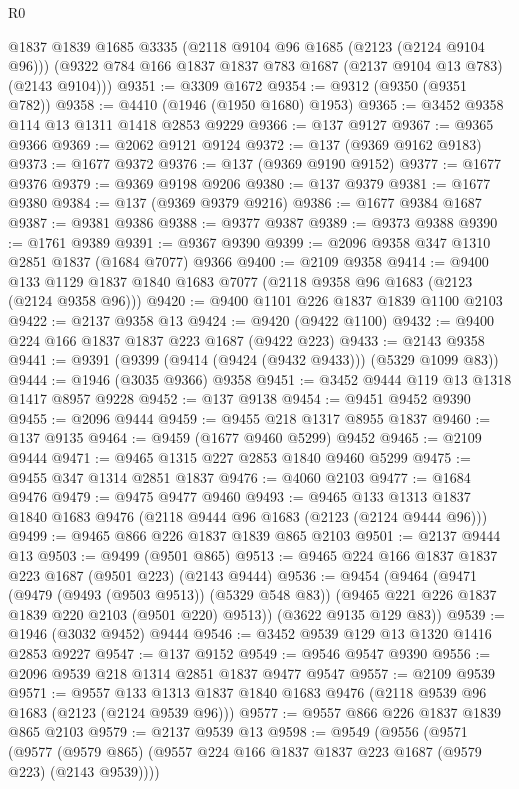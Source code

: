 \begin{lexlean}{R0}
\begin{coremodule}
      @1837
      @1839
      @1685
      @3335
      (@2118 @9104 @96 @1685 (@2123 (@2124 @9104 @96)))
      (@9322 @784 @166 @1837 @1837 @783 @1687 (@2137 @9104 @13 @783) (@2143 @9104)))
@9351 := @3309 @1672
@9354 := @9312 (@9350 (@9351 @782))
@9358 := @4410 (@1946 (@1950 @1680) @1953)
@9365 := @3452 @9358 @114 @13 @1311 @1418 @2853 @9229
@9366 := @137 @9127
@9367 := @9365 @9366
@9369 := @2062 @9121 @9124
@9372 := @137 (@9369 @9162 @9183)
@9373 := @1677 @9372
@9376 := @137 (@9369 @9190 @9152)
@9377 := @1677 @9376
@9379 := @9369 @9198 @9206
@9380 := @137 @9379
@9381 := @1677 @9380
@9384 := @137 (@9369 @9379 @9216)
@9386 := @1677 @9384 @1687
@9387 := @9381 @9386
@9388 := @9377 @9387
@9389 := @9373 @9388
@9390 := @1761 @9389
@9391 := @9367 @9390
@9399 := @2096 @9358 @347 @1310 @2851 @1837 (@1684 @7077) @9366
@9400 := @2109 @9358
@9414 := @9400 @133 @1129 @1837 @1840 @1683 @7077 (@2118 @9358 @96 @1683 (@2123 (@2124 @9358 @96)))
@9420 := @9400 @1101 @226 @1837 @1839 @1100 @2103
@9422 := @2137 @9358 @13
@9424 := @9420 (@9422 @1100)
@9432 := @9400 @224 @166 @1837 @1837 @223 @1687 (@9422 @223)
@9433 := @2143 @9358
@9441 := @9391 (@9399 (@9414 (@9424 (@9432 @9433))) (@5329 @1099 @83))
@9444 := @1946 (@3035 @9366) @9358
@9451 := @3452 @9444 @119 @13 @1318 @1417 @8957 @9228
@9452 := @137 @9138
@9454 := @9451 @9452 @9390
@9455 := @2096 @9444
@9459 := @9455 @218 @1317 @8955 @1837
@9460 := @137 @9135
@9464 := @9459 (@1677 @9460 @5299) @9452
@9465 := @2109 @9444
@9471 := @9465 @1315 @227 @2853 @1840 @9460 @5299
@9475 := @9455 @347 @1314 @2851 @1837
@9476 := @4060 @2103
@9477 := @1684 @9476
@9479 := @9475 @9477 @9460
@9493 := @9465 @133 @1313 @1837 @1840 @1683 @9476 (@2118 @9444 @96 @1683 (@2123 (@2124 @9444 @96)))
@9499 := @9465 @866 @226 @1837 @1839 @865 @2103
@9501 := @2137 @9444 @13
@9503 := @9499 (@9501 @865)
@9513 := @9465 @224 @166 @1837 @1837 @223 @1687 (@9501 @223) (@2143 @9444)
@9536 := @9454
    (@9464
      (@9471
        (@9479 (@9493 (@9503 @9513)) (@5329 @548 @83))
        (@9465 @221 @226 @1837 @1839 @220 @2103 (@9501 @220) @9513))
      (@3622 @9135 @129 @83))
@9539 := @1946 (@3032 @9452) @9444
@9546 := @3452 @9539 @129 @13 @1320 @1416 @2853 @9227
@9547 := @137 @9152
@9549 := @9546 @9547 @9390
@9556 := @2096 @9539 @218 @1314 @2851 @1837 @9477 @9547
@9557 := @2109 @9539
@9571 := @9557 @133 @1313 @1837 @1840 @1683 @9476 (@2118 @9539 @96 @1683 (@2123 (@2124 @9539 @96)))
@9577 := @9557 @866 @226 @1837 @1839 @865 @2103
@9579 := @2137 @9539 @13
@9598 := @9549
    (@9556
      (@9571
        (@9577 (@9579 @865) (@9557 @224 @166 @1837 @1837 @223 @1687 (@9579 @223) (@2143 @9539))))

\end{coremodule}
\end{lexlean}
